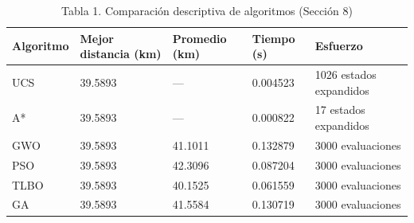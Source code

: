 \begin{table}[htbp]
  \centering
  \caption{Tabla 1. Comparación descriptiva de algoritmos (Sección 8)}
  \label{tab:tabla-1-comparacion-principal}
  \begin{tabular}{lllll}
    \toprule
    Algoritmo & Mejor distancia (km) & Promedio (km) & Tiempo (s) & Esfuerzo \\
    \midrule
    UCS & 39.5893 & --- & 0.004523 & 1026 estados expandidos \\
    A* & 39.5893 & --- & 0.000822 & 17 estados expandidos \\
    GWO & 39.5893 & 41.1011 & 0.132879 & 3000 evaluaciones \\
    PSO & 39.5893 & 42.3096 & 0.087204 & 3000 evaluaciones \\
    TLBO & 39.5893 & 40.1525 & 0.061559 & 3000 evaluaciones \\
    GA & 39.5893 & 41.5584 & 0.130719 & 3000 evaluaciones \\
    \bottomrule
  \end{tabular}
\end{table}
